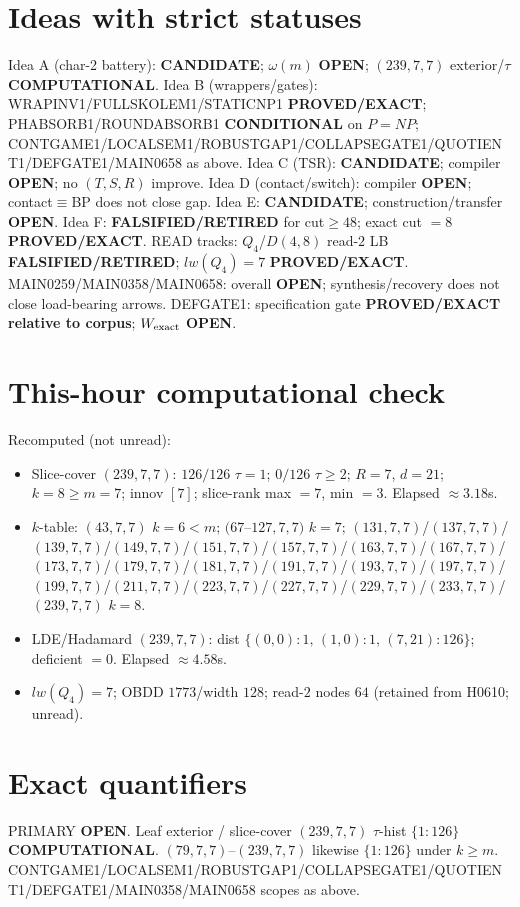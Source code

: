 \documentclass[11pt]{article}
\begin{document}
\section*{Ideas with strict statuses}
Idea A (char-2 battery): \textbf{CANDIDATE}; $\omega(m)$ \textbf{OPEN}; $(239,7,7)$ exterior/$\tau$ \textbf{COMPUTATIONAL}.
Idea B (wrappers/gates): WRAPINV1/FULLSKOLEM1/STATICNP1 \textbf{PROVED/EXACT};
PHABSORB1/ROUNDABSORB1 \textbf{CONDITIONAL} on $P=NP$;
CONTGAME1/LOCALSEM1/ROBUSTGAP1/COLLAPSEGATE1/QUOTIENT1/DEFGATE1/MAIN0658 as above.
Idea C (TSR): \textbf{CANDIDATE}; compiler \textbf{OPEN}; no $(T,S,R)$ improve.
Idea D (contact/switch): compiler \textbf{OPEN}; contact$\equiv$BP does not close gap.
Idea E: \textbf{CANDIDATE}; construction/transfer \textbf{OPEN}.
Idea F: \textbf{FALSIFIED/RETIRED} for cut$\ge48$; exact cut $=8$ \textbf{PROVED/EXACT}.
READ tracks: $Q_4$/$D(4,8)$ read-$2$ LB \textbf{FALSIFIED/RETIRED}; $lw(Q_4)=7$ \textbf{PROVED/EXACT}.
MAIN0259/MAIN0358/MAIN0658: overall \textbf{OPEN}; synthesis/recovery does not close load-bearing arrows.
DEFGATE1: specification gate \textbf{PROVED/EXACT relative to corpus}; $W_{\rm exact}$ \textbf{OPEN}.

\section*{This-hour computational check}
Recomputed (not unread):
\begin{itemize}
\item Slice-cover $(239,7,7)$: $126/126$ $\tau{=}1$; $0/126$ $\tau{\ge}2$; $R{=}7$, $d{=}21$;
  $k{=}8{\ge}m{=}7$; innov $[7]$; slice-rank max $=7$, min $=3$. Elapsed $\approx3.18$s.
\item $k$-table: $(43,7,7)$ $k{=}6{<}m$; $(67$--$127,7,7)$ $k{=}7$;
  $(131,7,7)$/$(137,7,7)$/$(139,7,7)$/$(149,7,7)$/$(151,7,7)$/$(157,7,7)$/$(163,7,7)$/$(167,7,7)$/$(173,7,7)$/$(179,7,7)$/$(181,7,7)$/$(191,7,7)$/$(193,7,7)$/$(197,7,7)$/$(199,7,7)$/$(211,7,7)$/$(223,7,7)$/$(227,7,7)$/$(229,7,7)$/$(233,7,7)$/$(239,7,7)$ $k{=}8$.
\item LDE/Hadamard $(239,7,7)$: dist $\{(0,0){:}1,\,(1,0){:}1,\,(7,21){:}126\}$; deficient $=0$. Elapsed $\approx4.58$s.
\item $lw(Q_4)=7$; OBDD $1773$/width $128$; read-$2$ nodes $64$ (retained from H0610; unread).
\end{itemize}

\section*{Exact quantifiers}
PRIMARY \textbf{OPEN}. Leaf exterior / slice-cover $(239,7,7)$ $\tau$-hist $\{1{:}126\}$ \textbf{COMPUTATIONAL}.
$(79,7,7)$--$(239,7,7)$ likewise $\{1{:}126\}$ under $k{\ge}m$. CONTGAME1/LOCALSEM1/ROBUSTGAP1/COLLAPSEGATE1/QUOTIENT1/DEFGATE1/MAIN0358/MAIN0658 scopes as above.
\end{document}
